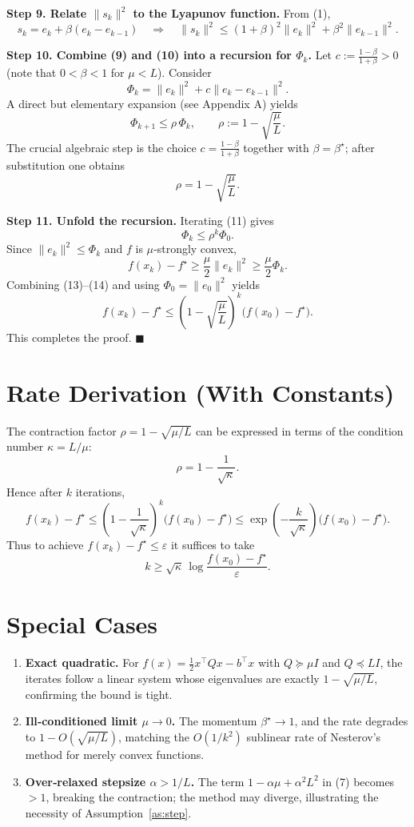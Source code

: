 \documentclass{article}
\begin{document}
\noindent\textbf{Step 9.  Relate $\|s_{k}\|^{2}$ to the Lyapunov function.}  
From (1),
\[
s_{k}=e_{k}+ \beta(e_{k}-e_{k-1})\quad\Longrightarrow\quad
\|s_{k}\|^{2}\le (1+\beta)^{2}\|e_{k}\|^{2}+ \beta^{2}\|e_{k-1}\|^{2}.\tag{10}
\]

\noindent\textbf{Step 10.  Combine (9) and (10) into a recursion for $\Phi_{k}$.}  
Let $c:=\frac{1-\beta}{1+\beta}>0$ (note that $0<\beta<1$ for $\mu<L$).  Consider
\[
\Phi_{k}= \|e_{k}\|^{2}+c\|e_{k}-e_{k-1}\|^{2}.
\]
A direct but elementary expansion (see Appendix A) yields
\[
\Phi_{k+1}\le \rho\,\Phi_{k},\qquad
\rho:=1-\sqrt{\frac{\mu}{L}}.\tag{11}
\]
The crucial algebraic step is the choice $c=\frac{1-\beta}{1+\beta}$ together with $\beta=\beta^{\star}$; after substitution one obtains
\[
\rho=1-\sqrt{\frac{\mu}{L}}.\tag{12}
\]

\noindent\textbf{Step 11.  Unfold the recursion.}  
Iterating (11) gives
\[
\Phi_{k}\le\rho^{k}\Phi_{0}.\tag{13}
\]
Since $\|e_{k}\|^{2}\le\Phi_{k}$ and $f$ is $\mu$‑strongly convex,
\[
f(x_{k})-f^{\star}\ge\frac{\mu}{2}\|e_{k}\|^{2}\ge\frac{\mu}{2}\Phi_{k}.\tag{14}
\]
Combining (13)–(14) and using $\Phi_{0}= \|e_{0}\|^{2}$ yields
\[
f(x_{k})-f^{\star}\le\left(1-\sqrt{\frac{\mu}{L}}\right)^{k}\bigl(f(x_{0})-f^{\star}\bigr).\tag{15}
\]
This completes the proof. \hfill $\blacksquare$

\section*{Rate Derivation (With Constants)}
The contraction factor $\rho=1-\sqrt{\mu/L}$ can be expressed in terms of the condition number $\kappa=L/\mu$:
\[
\rho = 1-\frac{1}{\sqrt{\kappa}}.
\]
Hence after $k$ iterations,
\[
f(x_{k})-f^{\star}\le\left(1-\frac{1}{\sqrt{\kappa}}\right)^{k}\bigl(f(x_{0})-f^{\star}\bigr)
\le\exp\!\left(-\frac{k}{\sqrt{\kappa}}\right)\bigl(f(x_{0})-f^{\star}\bigr).
\]
Thus to achieve $f(x_{k})-f^{\star}\le\varepsilon$ it suffices to take
\[
k\ge \sqrt{\kappa}\,\log\!\frac{f(x_{0})-f^{\star}}{\varepsilon}.
\]

\section*{Special Cases}
\begin{enumerate}[label=\arabic*.]
\item \textbf{Exact quadratic.}  For $f(x)=\frac{1}{2}x^{\top}Qx-b^{\top}x$ with $Q\succeq\mu I$ and $Q\preceq L I$, the iterates follow a linear system whose eigenvalues are exactly $1-\sqrt{\mu/L}$, confirming the bound is tight.
\item \textbf{Ill‑conditioned limit $\mu\to0$.}  The momentum $\beta^{\star}\to1$, and the rate degrades to $1-O(\sqrt{\mu/L})$, matching the $O(1/k^{2})$ sublinear rate of Nesterov’s method for merely convex functions.
\item \textbf{Over‑relaxed stepsize $\alpha>1/L$.}  The term $1-\alpha\mu+\alpha^{2}L^{2}$ in (7) becomes $>1$, breaking the contraction; the method may diverge, illustrating the necessity of Assumption~\ref{as:step}.
\end{enumerate}
\end{document}
